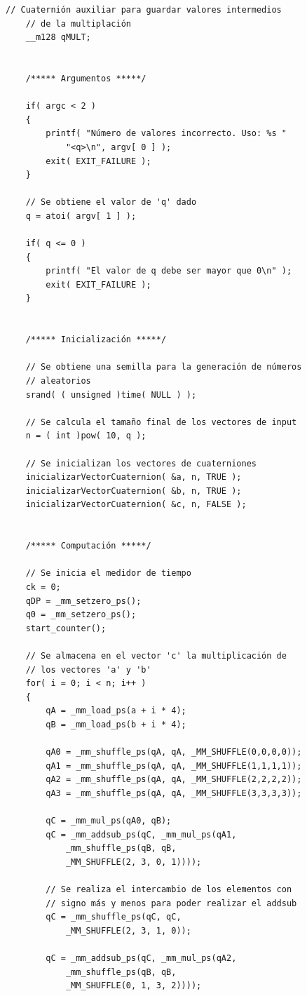 \documentclass[conference]{IEEEtran}
\begin{document}
\begin{lstlisting}[style=CStyle, title=Código con la multiplicación vectorizada.]
    // Cuaternión auxiliar para guardar valores intermedios
    // de la multiplación
    __m128 qMULT;


    /***** Argumentos *****/

    if( argc < 2 )
    {
        printf( "Número de valores incorrecto. Uso: %s "
            "<q>\n", argv[ 0 ] );
        exit( EXIT_FAILURE );
    }

    // Se obtiene el valor de 'q' dado
    q = atoi( argv[ 1 ] );

    if( q <= 0 )
    {
        printf( "El valor de q debe ser mayor que 0\n" );
        exit( EXIT_FAILURE );
    }


    /***** Inicialización *****/

    // Se obtiene una semilla para la generación de números
    // aleatorios
    srand( ( unsigned )time( NULL ) );

    // Se calcula el tamaño final de los vectores de input
    n = ( int )pow( 10, q );

    // Se inicializan los vectores de cuaterniones
    inicializarVectorCuaternion( &a, n, TRUE );
    inicializarVectorCuaternion( &b, n, TRUE );
    inicializarVectorCuaternion( &c, n, FALSE );


    /***** Computación *****/

    // Se inicia el medidor de tiempo
    ck = 0;
    qDP = _mm_setzero_ps();
    q0 = _mm_setzero_ps();
    start_counter();

    // Se almacena en el vector 'c' la multiplicación de
    // los vectores 'a' y 'b'
    for( i = 0; i < n; i++ )
    {
        qA = _mm_load_ps(a + i * 4);
        qB = _mm_load_ps(b + i * 4);

        qA0 = _mm_shuffle_ps(qA, qA, _MM_SHUFFLE(0,0,0,0));
        qA1 = _mm_shuffle_ps(qA, qA, _MM_SHUFFLE(1,1,1,1));
        qA2 = _mm_shuffle_ps(qA, qA, _MM_SHUFFLE(2,2,2,2));
        qA3 = _mm_shuffle_ps(qA, qA, _MM_SHUFFLE(3,3,3,3));

        qC = _mm_mul_ps(qA0, qB);
        qC = _mm_addsub_ps(qC, _mm_mul_ps(qA1,
            _mm_shuffle_ps(qB, qB,
            _MM_SHUFFLE(2, 3, 0, 1))));

        // Se realiza el intercambio de los elementos con
        // signo más y menos para poder realizar el addsub
        qC = _mm_shuffle_ps(qC, qC,
            _MM_SHUFFLE(2, 3, 1, 0));

        qC = _mm_addsub_ps(qC, _mm_mul_ps(qA2,
            _mm_shuffle_ps(qB, qB,
            _MM_SHUFFLE(0, 1, 3, 2))));


\end{lstlisting}
\end{document}
